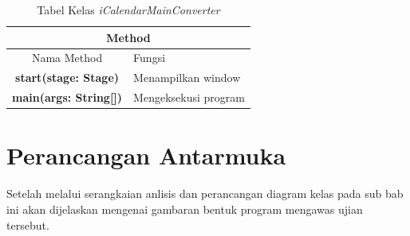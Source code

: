 \begin{table}[H]
	\centering
		\caption{Tabel Kelas \textit{iCalendarMainConverter}}
		\label{tab:iCalendarMainConverter}
		\begin{tabular}{ | c | c | p{4cm} |}
			\hline
				\multicolumn{3}{|c|}{Method}  \\ \hline
				\multicolumn{2}{|c|}{Nama Method} & Fungsi \\ \hline
				\multicolumn{2}{|c|}{\textbf{start(stage: Stage)}} & Menampilkan window\\ \hline
			\multicolumn{2}{|c|}{\textbf{main(args: String[])}} & Mengeksekusi program\\ \hline
		\end{tabular}
\end{table}

\section{Perancangan Antarmuka}
Setelah melalui serangkaian anlisis dan perancangan diagram kelas pada sub bab ini akan dijelaskan mengenai gambaran bentuk program mengawas ujian tersebut.

